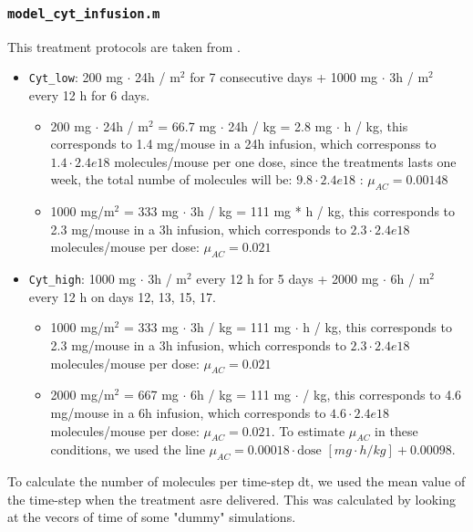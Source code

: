 \subsubsection{\texttt{model\_cyt\_infusion.m}}
This treatment protocols are taken from \cite{cyt-3}.
\begin{itemize}
	\item \texttt{Cyt\_low}: 200 mg $\cdot$ 24h / m$^2$ for 7 consecutive days + 1000 mg $\cdot$ 3h / m$^2$ every 12 h for 6 days.
	\begin{itemize}
		\item 200 mg $\cdot$ 24h / m$^2$ = 66.7 mg $\cdot$ 24h / kg = 2.8 mg $\cdot$ h / kg, this corresponds to 1.4 mg/mouse in a 24h infusion, which corresponss to $1.4 \cdot 2.4e18$ molecules/mouse per one dose, since the treatments lasts one week, the total numbe of molecules will be: $9.8 \cdot 2.4e18$ : $\mu_{AC} = 0.00148$
		\item 1000 mg/m$^2$ = 333 mg $\cdot$ 3h / kg = 111 mg * h / kg, this corresponds to 2.3 mg/mouse in a 3h infusion, which corresponds to $2.3 \cdot 2.4e18$ molecules/mouse per dose: $\mu_{AC} = 0.021$
	\end{itemize}

	\item \texttt{Cyt\_high}: 1000 mg $\cdot$ 3h / m$^2$ every 12 h for 5 days + 2000 mg $\cdot$ 6h / m$^2$ every 12 h on days 12, 13, 15, 17.
	\begin{itemize}
		\item 1000 mg/m$^2$ = 333 mg $\cdot$ 3h / kg = 111 mg $\cdot$ h / kg, this corresponds to 2.3 mg/mouse in a 3h infusion, which corresponds to $2.3 \cdot 2.4e18$ molecules/mouse per dose: $\mu_{AC} = 0.021$
		\item 2000 mg/m$^2$ = 667 mg $\cdot$ 6h / kg = 111 mg $\cdot$ / kg, this corresponds to 4.6 mg/mouse in a 6h infusion, which corresponds to $4.6 \cdot 2.4e18$ molecules/mouse per dose: $\mu_{AC} = 0.021$. To estimate $\mu_{AC}$ in these conditions, we used the line $\mu_{AC} = 0.00018 \cdot \text{dose}$ $[mg \cdot h/kg]+ 0.00098$.
	\end{itemize}
\end{itemize}

To calculate the number of molecules per time-step dt, we used the mean value of the time-step when the treatment asre delivered. This was calculated by looking at the vecors of time of some "dummy" simulations.

